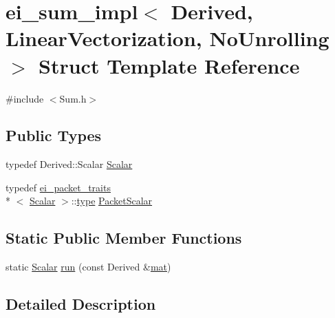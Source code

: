 \hypertarget{structei__sum__impl_3_01_derived_00_01_linear_vectorization_00_01_no_unrolling_01_4}{\section{ei\-\_\-sum\-\_\-impl$<$ Derived, Linear\-Vectorization, No\-Unrolling $>$ Struct Template Reference}
\label{structei__sum__impl_3_01_derived_00_01_linear_vectorization_00_01_no_unrolling_01_4}
}


{\ttfamily \#include $<$Sum.\-h$>$}

\subsection*{Public Types}
\begin{DoxyCompactItemize}
\item 
typedef Derived\-::\-Scalar \hyperlink{structei__sum__impl_3_01_derived_00_01_linear_vectorization_00_01_no_unrolling_01_4_aa106c26c2a9cf06300b204f811c40737}{Scalar}
\item 
typedef \hyperlink{structei__packet__traits}{ei\-\_\-packet\-\_\-traits}\\*
$<$ \hyperlink{structei__sum__impl_3_01_derived_00_01_linear_vectorization_00_01_no_unrolling_01_4_aa106c26c2a9cf06300b204f811c40737}{Scalar} $>$\-::\hyperlink{glext_8h_a7d05960f4f1c1b11f3177dc963a45d86}{type} \hyperlink{structei__sum__impl_3_01_derived_00_01_linear_vectorization_00_01_no_unrolling_01_4_af94e12fedd90b7ada7f51d40e6f4b37b}{Packet\-Scalar}
\end{DoxyCompactItemize}
\subsection*{Static Public Member Functions}
\begin{DoxyCompactItemize}
\item 
static \hyperlink{structei__sum__impl_3_01_derived_00_01_linear_vectorization_00_01_no_unrolling_01_4_aa106c26c2a9cf06300b204f811c40737}{Scalar} \hyperlink{structei__sum__impl_3_01_derived_00_01_linear_vectorization_00_01_no_unrolling_01_4_a62de905a613928bb9eb0eccd98a5caa6}{run} (const Derived \&\hyperlink{uavobjecttemplate_8m_a16a51e808b16c46bbfd36da2e37cd123}{mat})
\end{DoxyCompactItemize}


\subsection{Detailed Description}
